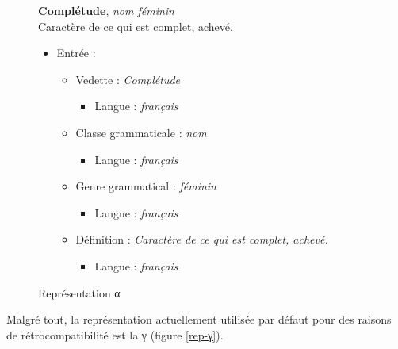 \documentclass[10pt]{report}
\newcommand{\entité}[1]{\textcolor{blue!60!black}{#1}}
\newcommand{\caractéristique}[1]{\textcolor{green!60!black}{#1}}
\newcommand{\entitétechnique}[1]{\textcolor{blue!50!red}{#1}}
\begin{document}
\begin{figure}[H]
	\centering
	\begin{minipage}{0.3\linewidth}
    \textbf{Complétude}, \textit{nom féminin}\\    
    Caractère de ce qui est complet, achevé.
	\end{minipage}%
	\begin{minipage}{0.5\linewidth}
    \begin{itemize}
    	\item \entité{Entrée} :
    	\begin{itemize}
        \item \entité{Vedette} : \textit{Complétude}
        \begin{itemize}
        	\item \caractéristique{Langue} : \textit{français}
        \end{itemize}
        \item \entité{Classe grammaticale} : \textit{nom}
        \begin{itemize}
        	\item \caractéristique{Langue} : \textit{français}
        \end{itemize}
        \item \entité{Genre grammatical} : \textit{féminin}
        \begin{itemize}
        	\item \caractéristique{Langue} : \textit{français}
        \end{itemize}
        \item \entité{Définition} : \textit{Caractère de ce qui est complet, achevé.}
        \begin{itemize}
        	\item \caractéristique{Langue} : \textit{français}
        \end{itemize}
    	\end{itemize}
    \end{itemize}
	\end{minipage}
	\caption{Représentation α}
	\label{rep-α}
\end{figure}

Malgré tout, la représentation actuellement utilisée par défaut pour des raisons de rétrocompatibilité est la γ (figure \ref{rep-γ}).
\end{document}
